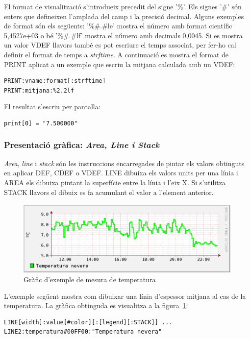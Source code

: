 El format de visualització s'introdueix precedit del signe '\%'. Els signes '\#' són enters que defineixen l'amplada del camp i la precisió decimal. Alguns exemples de format són els següents: '\%\#.\#le' mostra el número amb format científic 5,4527e+03 o bé '\%\#.\#lf' mostra el número amb decimals 0,0045.
Si es mostra un valor VDEF llavors també es pot escriure el temps associat, per fer-ho cal definir el format de temps a \emph{strftime}.
A continuació es mostra el format de PRINT aplicat a un exemple que escriu la mitjana calculada amb un VDEF:
\begin{verbatim}
PRINT:vname:format[:strftime]
PRINT:mitjana:%2.2lf
\end{verbatim}

El resultat s'escriu per pantalla:
\begin{lstlisting}[mathescape=true]
print[0] = "7.500000"
\end{lstlisting}

\subsubsection{Presentació gràfica: \emph{Area, Line i Stack}}

\emph{Area}, \emph{line} i \emph{stack} són les instruccions encarregades de pintar els valors obtinguts en aplicar DEF, CDEF o VDEF. LINE dibuixa els valors units per una línia i AREA els dibuixa pintant la superfície entre la línia i l'eix X. Si s'utilitza STACK llavors el dibuix es fa acumulant el valor a  l'element anterior.

\begin{figure}[ht]
\includegraphics[width=\textwidth]{imatges/rrd/temperatura.eps}
\caption{Gràfic d'exemple de mesura de temperatura}
\label{tempNevera}
\end{figure}


L'exemple següent mostra com dibuixar una línia d'espessor mitjana al cas de la temperatura. La gràfica obtinguda es visualitza a la figura~\ref{tempNevera}:
\begin{verbatim}
LINE[width]:value[#color][:[legend][:STACK]] ...
LINE2:temperatura#00FF00:"Temperatura nevera" 
\end{verbatim}










	


